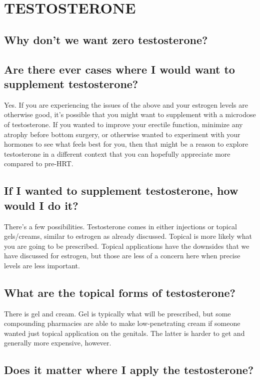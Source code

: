 \documentclass{article}
\begin{document}
\section{TESTOSTERONE}\label{T}

\subsection{Why don’t we want zero testosterone?}


\subsection{Are there ever cases where I would want to supplement testosterone?}\label{9-2}

Yes. If you are experiencing the issues of the above and your estrogen levels are otherwise good, it’s possible that you might want to supplement with a microdose of testosterone. If you wanted to improve your erectile function, minimize any atrophy before bottom surgery, or otherwise wanted to experiment with your hormones to see what feels best for you, then that might be a reason to explore testosterone in a different context that you can hopefully appreciate more compared to pre-HRT.

\subsection{If I wanted to supplement testosterone, how would I do it?}

There’s a few possibilities. Testosterone comes in either injections or topical gels/creams, similar to estrogen as already discussed. Topical is more likely what you are going to be prescribed. Topical applications have the downsides that we have discussed for estrogen, but those are less of a concern here when precise levels are less important.

\subsection{What are the topical forms of testosterone?}

There is gel and cream. Gel is typically what will be prescribed, but some compounding pharmacies are able to make low-penetrating cream if someone wanted just topical application on the genitals. The latter is harder to get and generally more expensive, however.

\subsection{Does it matter where I apply the testosterone?}
\end{document}
